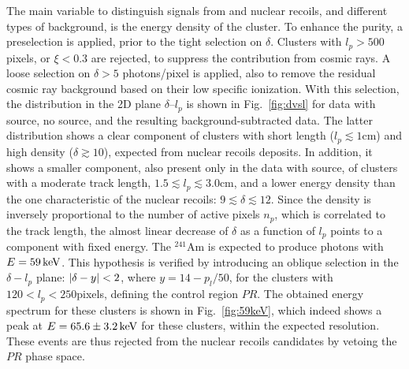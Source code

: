 The main variable to distinguish signals from and nuclear recoils, and
different types of background, is the energy density of the cluster.
To enhance the purity, a preselection is applied, prior to the tight
selection on $\delta$. Clusters with $l_p>500$ pixels, or $\xi<0.3$
are rejected, to suppress the contribution from cosmic rays. A loose
selection on $\delta>5$ photons/pixel is applied, also to remove the
residual cosmic ray background based on their low specific ionization.
With this selection, the distribution in the 2D plane $\delta$--$l_p$
is shown in Fig.~\ref{fig:dvsl} for data with \ambe source, no source,
and the resulting background-subtracted \ambe data. The latter
distribution shows a clear component of clusters with short length
($l_p\lesssim1$\unit{cm}) and high density ($\delta\gtrsim 10$),
expected from nuclear recoils deposits. In addition, it shows a
smaller component, also present only in the data with \ambe source, of
clusters with a moderate track length, $1.5 \lesssim l_p \lesssim
3.0$\unit{cm}, and a lower energy density than the one characteristic
of the nuclear recoils: $9\lesssim\delta\lesssim12$. Since the density
is inversely proportional to the number of active pixels $n_p$, which
is correlated to the track length, the almost linear decrease of
$\delta$ as a function of $l_p$ points to a component with fixed
energy. The $^{241}$Am is expected to produce photons with
$E=59\,\textrm{ke\hspace{-.08em}V}$. This hypothesis is verified by introducing an oblique
selection in the $\delta-l_p$ plane: $\vert \delta-y \vert<2$, where
$y=14-p_l/50$, for the clusters with $120<l_p<250$\unit{pixels},
defining the control region $PR$. The obtained energy spectrum for
these clusters is shown in Fig.~\ref{fig:59keV}, which indeed shows a
peak at $E=65.6\pm3.2\,\textrm{ke\hspace{-.08em}V}$ for these clusters, within the expected
resolution. These events are thus rejected from the nuclear recoils
candidates by vetoing the $PR$ phase space.


